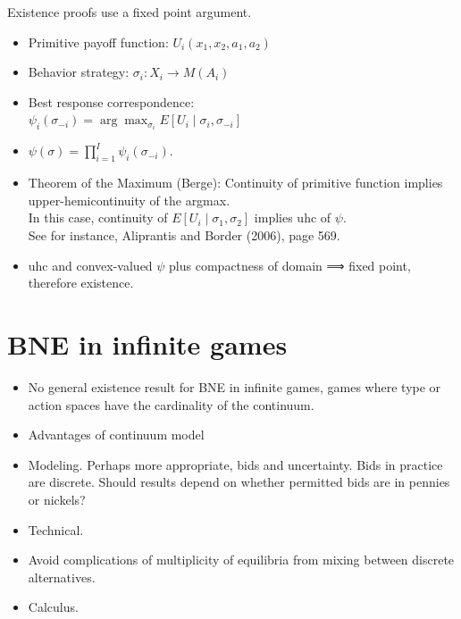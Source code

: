 \documentclass[10pt]{article}
\begin{document}
Existence proofs use a fixed point argument.

\begin{itemize}
  \item Primitive payoff function: $U_{i}\left(x_{1}, x_{2}, a_{1}, a_{2}\right)$
  \item Behavior strategy: $\sigma_{i}: X_{i} \rightarrow M\left(A_{i}\right)$
  \item Best response correspondence:\\
$\psi_{i}\left(\sigma_{-i}\right)=\arg \max _{\sigma_{i}} E\left[U_{i} \mid \sigma_{i}, \sigma_{-i}\right]$
  \item $\psi(\sigma)=\prod_{i=1}^{I} \psi_{i}\left(\sigma_{-i}\right)$.
  \item Theorem of the Maximum (Berge): Continuity of primitive function implies upper-hemicontinuity of the argmax.\\
In this case, continuity of $E\left[U_{i} \mid \sigma_{1}, \sigma_{2}\right]$ implies uhc of $\psi$.\\
See for instance, Aliprantis and Border (2006), page 569.
  \item uhc and convex-valued $\psi$ plus compactness of domain ⟹ fixed point, therefore existence.
\end{itemize}

\section*{BNE in infinite games}
\begin{itemize}
  \item No general existence result for BNE in infinite games, games where type or action spaces have the cardinality of the continuum.
  \item Advantages of continuum model
  \item Modeling. Perhaps more appropriate, bids and uncertainty. Bids in practice are discrete. Should results depend on whether permitted bids are in pennies or nickels?
  \item Technical.
  \item Avoid complications of multiplicity of equilibria from mixing between discrete alternatives.
  \item Calculus.
\end{itemize}
\end{document}

